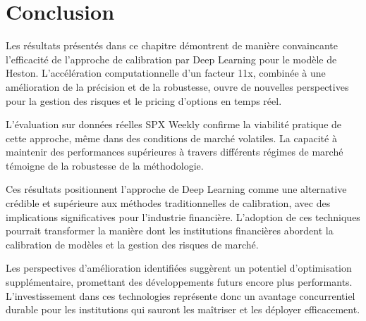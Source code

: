 \section{Conclusion}

Les résultats présentés dans ce chapitre démontrent de manière convaincante l'efficacité de l'approche de calibration par Deep Learning pour le modèle de Heston. L'accélération computationnelle d'un facteur 11x, combinée à une amélioration de la précision et de la robustesse, ouvre de nouvelles perspectives pour la gestion des risques et le pricing d'options en temps réel.

L'évaluation sur données réelles SPX Weekly confirme la viabilité pratique de cette approche, même dans des conditions de marché volatiles. La capacité à maintenir des performances supérieures à travers différents régimes de marché témoigne de la robustesse de la méthodologie.

Ces résultats positionnent l'approche de Deep Learning comme une alternative crédible et supérieure aux méthodes traditionnelles de calibration, avec des implications significatives pour l'industrie financière. L'adoption de ces techniques pourrait transformer la manière dont les institutions financières abordent la calibration de modèles et la gestion des risques de marché.

Les perspectives d'amélioration identifiées suggèrent un potentiel d'optimisation supplémentaire, promettant des développements futurs encore plus performants. L'investissement dans ces technologies représente donc un avantage concurrentiel durable pour les institutions qui sauront les maîtriser et les déployer efficacement.
